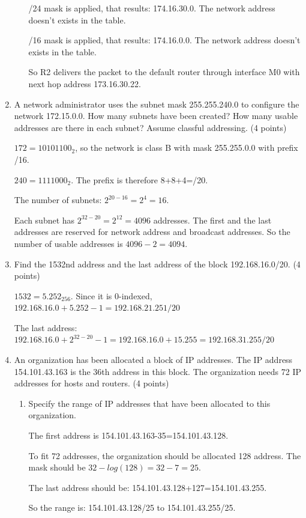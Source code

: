 \documentclass{article}
\begin{document}
\begin{enumerate}
\begin{enumerate}
    /24 mask is applied, that results: 174.16.30.0. The network address doesn't exists in the table.

    /16 mask is applied, that results: 174.16.0.0. The network address doesn't exists in the table.

    So R2 delivers the packet to the default router through interface M0 with next hop address 173.16.30.22.
  \end{enumerate}
  \item A network administrator uses the subnet mask 255.255.240.0 to configure the network 172.15.0.0.
  How many subnets have been created? How many usable addresses are there in each subnet? Assume classful addressing. (4 points)

  $172=10101100_2$, so the network is class B with mask 255.255.0.0 with prefix /16.
  
  $240=1111000_2$. The prefix is therefore 8+8+4=/20.

  The number of subnets: $2^{20-16}=2^4=16$.
  
  Each subnet has $2^{32-20}=2^{12}=4096$ addresses.
  The first and the last addresses are reserved for network address and broadcast addresses.
  So the number of usable addresses is $4096-2=4094$.

  \item Find the 1532nd address and the last address of the block 192.168.16.0/20. (4 points)

  $1532=5.252_{256}$. Since it is 0-indexed, $192.168.16.0+5.252-1=192.168.21.251/20$
  
  The last address: $192.168.16.0+2^{32-20}-1=192.168.16.0+15.255=192.168.31.255/20$

  \item An organization has been allocated a block of IP addresses.
  The IP address 154.101.43.163 is the 36th address in this block.
  The organization needs 72 IP addresses for hosts and routers. (4 points)
  \begin{enumerate}
    \item Specify the range of IP addresses that have been allocated to this organization.

    The first address is 154.101.43.163-35=154.101.43.128.
    
    To fit 72 addresses, the organization should be allocated 128 address. The mask should be $32-log(128)=32-7=25$.

    The last address should be: 154.101.43.128+127=154.101.43.255.

    So the range is: 154.101.43.128/25 to 154.101.43.255/25.
    

\end{enumerate}
\end{enumerate}
\end{document}
